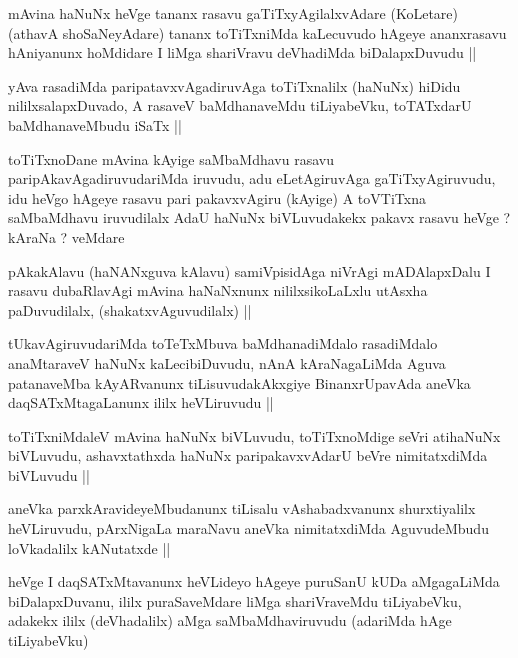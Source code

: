 \begin{artha}
mAvina haNuNx heVge tananx rasavu gaTiTxyAgilalxvAdare (KoLetare)
(athavA shoSaNeyAdare) tananx toTiTxniMda kaLecuvudo hAgeye
ananxrasavu hAniyanunx hoMdidare I liMga shariVravu deVhadiMda
biDalapxDuvudu ||
\end{artha}


\begin{artha}
yAva rasadiMda paripatavxvAgadiruvAga toTiTxnalilx (haNuNx) hiDidu
nililxsalapxDuvado, A rasaveV baMdhanaveMdu tiLiyabeVku, toTATxdarU
baMdhanaveMbudu iSaTx ||
\end{artha}

\begin{artha}
toTiTxnoDane mAvina kAyige saMbaMdhavu rasavu
paripAkavAgadiruvudariMda iruvudu, adu eLetAgiruvAga gaTiTxyAgiruvudu,
idu heVgo hAgeye rasavu pari pakavxvAgiru (kAyige) A toVTiTxna
saMbaMdhavu iruvudilalx AdaU haNuNx biVLuvudakekx pakavx rasavu heVge
? kAraNa ? veMdare 
\end{artha}

\begin{artha}
pAkakAlavu (haNANxguva kAlavu) samiVpisidAga niVrAgi mADAlapxDalu I
rasavu dubaRlavAgi mAvina haNaNxnunx nililxsikoLaLxlu utAsxha
paDuvudilalx, (shakatxvAguvudilalx) ||
\end{artha}

\begin{artha}
tUkavAgiruvudariMda toTeTxMbuva baMdhanadiMdalo rasadiMdalo
anaMtaraveV haNuNx kaLecibiDuvudu, nAnA kAraNagaLiMda Aguva
patanaveMba kAyARvanunx tiLisuvudakAkxgiye BinanxrUpavAda aneVka
daqSATxMtagaLanunx ililx heVLiruvudu ||
\end{artha}

\begin{artha}
toTiTxniMdaleV mAvina haNuNx biVLuvudu, toTiTxnoMdige seVri atihaNuNx
biVLuvudu, ashavxtathxda haNuNx paripakavxvAdarU beVre nimitatxdiMda
biVLuvudu ||
\end{artha}

\begin{artha}
aneVka parxkAravideyeMbudanunx tiLisalu vAshabadxvanunx shurxtiyalilx
heVLiruvudu, pArxNigaLa maraNavu aneVka nimitatxdiMda AguvudeMbudu
loVkadalilx kANutatxde ||
\end{artha}

\begin{artha}
heVge I daqSATxMtavanunx heVLideyo hAgeye puruSanU kUDa aMgagaLiMda
biDalapxDuvanu, ililx puraSaveMdare liMga shariVraveMdu tiLiyabeVku,
adakekx ililx (deVhadalilx) aMga saMbaMdhaviruvudu (adariMda hAge tiLiyabeVku)
\end{artha}

